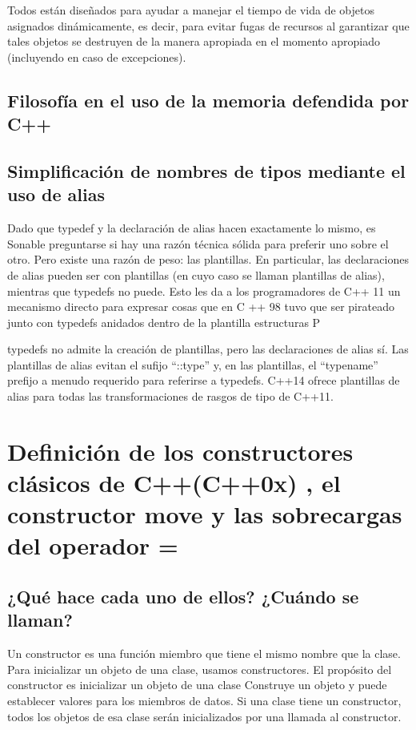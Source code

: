 \documentclass[10pt]{article}
\begin{document}
Todos están diseñados para ayudar a manejar el tiempo de vida de objetos asignados dinámicamente, es decir, para evitar fugas de recursos al garantizar que tales objetos se destruyen de la manera apropiada en el momento apropiado (incluyendo en caso de excepciones).

\subsection{Filosofía en el uso de la memoria defendida por C++}

\subsection{Simplificaci\'on de nombres de tipos mediante el uso de alias}

Dado que typedef y la declaración de alias hacen exactamente lo mismo, es Sonable preguntarse si hay una razón técnica sólida para preferir uno sobre el otro. Pero existe una razón de peso: las plantillas. En particular, las declaraciones de alias pueden ser con plantillas (en cuyo caso se llaman plantillas de alias), mientras que typedefs no puede.
Esto les da a los programadores de C++ 11 un mecanismo directo para expresar cosas que en C ++ 98 tuvo que ser pirateado junto con typedefs anidados dentro de la plantilla estructuras P

typedefs no admite la creación de plantillas, pero las declaraciones de alias sí.
Las plantillas de alias evitan el sufijo “::type” y, en las plantillas, el “typename”
prefijo a menudo requerido para referirse a typedefs.
C++14 ofrece plantillas de alias para todas las transformaciones de rasgos de tipo de C++11.

\vspace{2em}
\section{Definici\'on de  los constructores clásicos de C++(C++0x) , el constructor move y las sobrecargas del operador =}

\subsection{¿Qué hace cada uno de ellos? ¿Cuándo se llaman?}

Un constructor es una función miembro que tiene el mismo nombre que la clase. Para inicializar un objeto de una clase, usamos constructores. El propósito del constructor es inicializar un objeto de una clase Construye un objeto y puede establecer valores para los miembros de datos. Si una clase tiene un constructor, todos los objetos de esa clase serán inicializados por una llamada al constructor.
\end{document}
